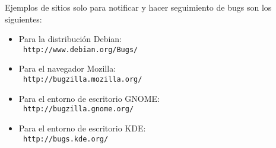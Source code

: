 Ejemplos de sitios solo para notificar y hacer seguimiento de bugs
son los siguientes:

\begin{itemize}

\item      Para     la      distribución      Debian:     \\      {\tt
http://www.debian.org/Bugs/}

\item    Para     el    navegador     {\sf    Mozilla}:     \\    {\tt
http://bugzilla.mozilla.org/}

\item   Para  el   entorno  de   escritorio  {\sf   GNOME}:  \\   {\tt
http://bugzilla.gnome.org/}

\item   Para   el  entorno   de   escritorio   {\sf  KDE}:   \\   {\tt
http://bugs.kde.org/}

\end{itemize}
